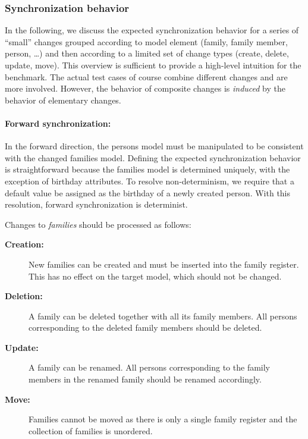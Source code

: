 \subsubsection{Synchronization behavior}      

In the following, we discuss the expected synchronization behavior for a series of ``small'' changes grouped according to model element (family, family member, person, \ldots) and then according to a limited set of change types (create, delete, update, move).
This overview is sufficient to provide a high-level intuition for the benchmark.
The actual test cases of course combine different changes and are more involved. However, the behavior of composite changes is \emph{induced} by the behavior of elementary changes.

\paragraph{Forward synchronization:}

In the forward direction, the persons model must be manipulated to be consistent with the changed families model.
Defining the expected synchronization behavior is straightforward because the families model is determined uniquely, with the exception of birthday attributes.
To resolve non-determinism, we require that a default value be assigned as the birthday of a newly created person.
With this resolution, forward synchronization is determinist.

\noindent Changes to \emph{families} should be processed as follows:

\begin{description}
    \item[\textbf{Creation:}]
    New families can be created and must be inserted into the family register.
    This has no effect on the target model, which should not be changed.
    
    \item[\textbf{Deletion:}]
    A family can be deleted together with all its family members.
    All persons corresponding to the deleted family members should be deleted.
    
    \item[\textbf{Update:}]
    A family can be renamed.  All persons corresponding to the family members in the renamed family should be renamed accordingly.
    
    \item[\textbf{Move:}]
    Families cannot be moved as there is only a single family register and the collection of families is unordered.
\end{description}

